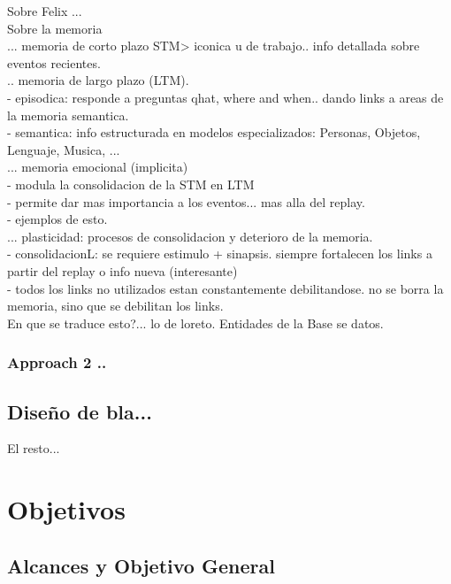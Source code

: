 \documentclass[12pt,letterpaper,spanish]{article}
\begin{document}
Sobre Felix ... \\

Sobre la memoria \cite{Eichenbaum:2008}\\
... memoria de corto plazo STM> iconica u de trabajo.. info detallada sobre eventos recientes.\\

.. memoria de largo plazo (LTM).\\
- episodica: responde a preguntas qhat, where and when.. dando links a areas de la memoria  semantica.\\
- semantica: info estructurada en modelos especializados: Personas, Objetos, Lenguaje, Musica, ...\\

... memoria emocional (implicita)\\
- modula la consolidacion de la STM en LTM\\
- permite dar mas importancia a los eventos... mas alla del replay.\\
- ejemplos de esto.\\

... plasticidad: procesos de consolidacion y deterioro de la memoria.\\
- consolidacionL: se requiere estimulo + sinapsis. siempre fortalecen los links a partir del replay o info nueva (interesante)\\
- todos los links no utilizados estan constantemente debilitandose. no se borra la memoria, sino que se debilitan los links.\\

En que se traduce esto?... lo de loreto. Entidades de la Base se datos.\\


\subsubsection{Approach 2 ..}


\subsection{Diseño de bla...}

El resto...

\section{Objetivos}

\subsection{Alcances y Objetivo General}
\end{document}
